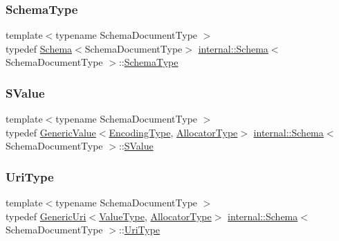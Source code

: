 \mbox{\label{classinternal_1_1Schema_ac2556ebf7a7db971e1c1c0f76eb5786e}} 
\subsubsection{\texorpdfstring{Schema\+Type}{SchemaType}}
{\footnotesize\ttfamily template$<$typename Schema\+Document\+Type $>$ \\
typedef \hyperlink{classinternal_1_1Schema}{Schema}$<$Schema\+Document\+Type$>$ \hyperlink{classinternal_1_1Schema}{internal\+::\+Schema}$<$ Schema\+Document\+Type $>$\+::\hyperlink{classinternal_1_1Schema_ac2556ebf7a7db971e1c1c0f76eb5786e}{Schema\+Type}}

\mbox{\label{classinternal_1_1Schema_ab3a07540a27d4cc2b0e260290c5c5771}} 
\subsubsection{\texorpdfstring{S\+Value}{SValue}}
{\footnotesize\ttfamily template$<$typename Schema\+Document\+Type $>$ \\
typedef \hyperlink{classGenericValue}{Generic\+Value}$<$\hyperlink{classinternal_1_1Schema_a9ea269c3ca8099c2a14b6519fe34efb1}{Encoding\+Type}, \hyperlink{classinternal_1_1Schema_a7af392edd81e610754cd2e6b4f82761c}{Allocator\+Type}$>$ \hyperlink{classinternal_1_1Schema}{internal\+::\+Schema}$<$ Schema\+Document\+Type $>$\+::\hyperlink{classinternal_1_1Schema_ab3a07540a27d4cc2b0e260290c5c5771}{S\+Value}}

\mbox{\label{classinternal_1_1Schema_a3b6cd85c3eeebe870cf8017d9d131d35}} 
\subsubsection{\texorpdfstring{Uri\+Type}{UriType}}
{\footnotesize\ttfamily template$<$typename Schema\+Document\+Type $>$ \\
typedef \hyperlink{classGenericUri}{Generic\+Uri}$<$\hyperlink{classinternal_1_1Schema_a8976b6d7e2a885483d0b51d941019340}{Value\+Type}, \hyperlink{classinternal_1_1Schema_a7af392edd81e610754cd2e6b4f82761c}{Allocator\+Type}$>$ \hyperlink{classinternal_1_1Schema}{internal\+::\+Schema}$<$ Schema\+Document\+Type $>$\+::\hyperlink{classinternal_1_1Schema_a3b6cd85c3eeebe870cf8017d9d131d35}{Uri\+Type}}

